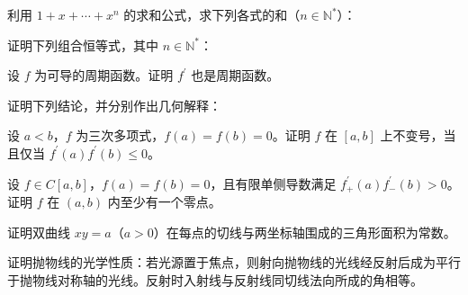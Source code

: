 \noindent\begin{minipage}{\textwidth}
利用 $1+x+\cdots+x^n$ 的求和公式，求下列各式的和（$n\in\mathbb N^*$）：
\end{minipage}\par\vfill
\noindent\begin{minipage}{\textwidth}
证明下列组合恒等式，其中 $n\in\mathbb N^*$：
\end{minipage}\par\vfill
\newpage
\noindent\begin{minipage}{\textwidth}
设 $f$ 为可导的周期函数。证明 $f^{\prime}$ 也是周期函数。
\end{minipage}\par\vfill
\noindent\begin{minipage}{\textwidth}
证明下列结论，并分别作出几何解释：
\end{minipage}\par\vfill
\noindent\begin{minipage}{\textwidth}
设 $a<b$，$f$ 为三次多项式，$f(a)=f(b)=0$。证明 $f$ 在 $[a,b]$ 上不变号，当且仅当 $f^{\prime}(a)f^{\prime}(b)\le0$。
\end{minipage}\par\vfill
\newpage
\noindent\begin{minipage}{\textwidth}
设 $f\in C[a,b]$，$f(a)=f(b)=0$，且有限单侧导数满足 $f^{\prime}_+(a)f^{\prime}_-(b)>0$。证明 $f$ 在 $(a,b)$ 内至少有一个零点。
\end{minipage}\par\vfill
\noindent\begin{minipage}{\textwidth}
证明双曲线 $xy=a$（$a>0$）在每点的切线与两坐标轴围成的三角形面积为常数。
\end{minipage}\par\vfill
\noindent\begin{minipage}{\textwidth}
证明抛物线的光学性质：若光源置于焦点，则射向抛物线的光线经反射后成为平行于抛物线对称轴的光线。反射时入射线与反射线同切线法向所成的角相等。
\end{minipage}\par\vfill
